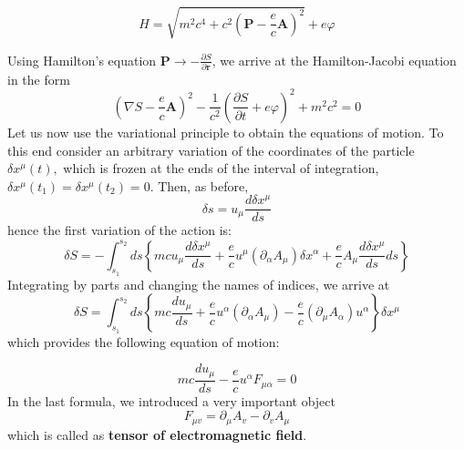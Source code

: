 \begin{qt}
    \begin{equation}
H=\sqrt{m^{2} c^{4}+c^{2}\left(\mathbf{P}-\frac{e}{c} \mathbf{A}\right)^{2}}+e \varphi
\end{equation}
\end{qt}
Using Hamilton's equation $\mathbf{P} \rightarrow-\frac{\partial S}{\partial \mathbf{r}}$, we arrive at the Hamilton-Jacobi equation in the form
\begin{equation}
\left(\nabla S-\frac{e}{c} \mathbf{A}\right)^{2}-\frac{1}{c^{2}}\left(\frac{\partial S}{\partial t}+e \varphi\right)^{2}+m^{2} c^{2}=0
\end{equation}
Let us now use the variational principle to obtain the equations of motion. To this end consider an arbitrary variation of the coordinates of the particle $\delta x^{\mu}(t),$ which is frozen at the ends of the interval of integration, $\delta x^{\mu}\left(t_{1}\right)=\delta x^{\mu}\left(t_{2}\right)=0 .$ Then, as before,
\begin{equation}
\delta s=u_{\mu} \frac{d \delta x^{\mu}}{d s}
\end{equation}
hence the first variation of the action is:
\begin{equation}
\delta S=-\int_{s_{1}}^{s_{2}} d s\left\{m c u_{\mu} \frac{d \delta x^{\mu}}{d s}+\frac{e}{c} u^{\mu} \left(\partial_{\alpha} A_{\mu}\right) \delta x^{\alpha}+\frac{e}{c} A_{\mu} \frac{d \delta x^{\mu}}{d s} d s\right\}
\end{equation}
Integrating by parts and changing the names of indices, we arrive at
\begin{equation}
\delta S=\int_{s_{1}}^{s_{2}} d s\left\{m c \frac{d u_{\mu}}{d s}+\frac{e}{c} u^{\alpha}\left(\partial_{\alpha} A_{\mu}\right)-\frac{e}{c}\left(\partial_{\mu} A_{\alpha}\right) u^{\alpha}\right\} \delta x^{\mu}
\end{equation}
which provides the following equation of motion:
\begin{qt}
    \begin{equation}
m c \frac{d u_{\mu}}{d s}-\frac{e}{c} u^{\alpha} F_{\mu \alpha}=0
\label{eqofmotion-electromeg-tensor}
\end{equation}
In the last formula, we introduced a very important object
\begin{equation}
F_{\mu v}=\partial_{\mu} A_{v}-\partial_{v} A_{\mu}
\label{electromagnetic-potential}
\end{equation}
which is called as \textbf{tensor of electromagnetic field}.
\end{qt}
